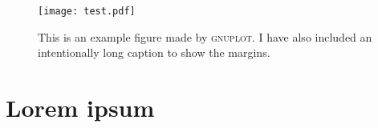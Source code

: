 \begin{figure}[t!]
  \centering
  \texttt{[image: test.pdf]}
  \caption
  {
    This is an example figure made by \textsc{gnuplot}. 
    I have also included an intentionally long caption to show the margins.
  }
  \label{fig:test}
\end{figure}

\section{Lorem ipsum}
\lipsum
